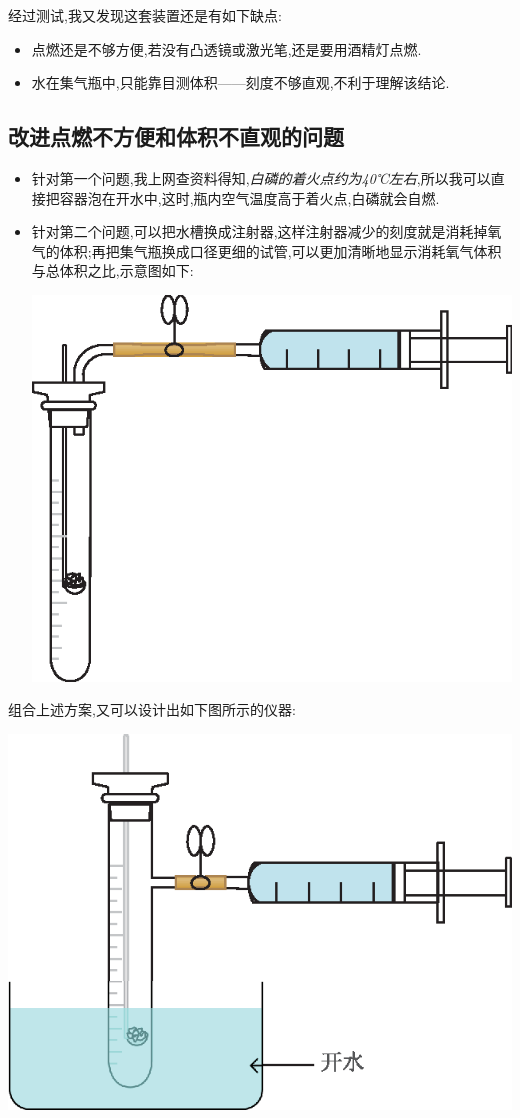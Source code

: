 \documentclass[11pt,a4paper,titlepage,twocolumn]{ctexart}
\begin{document}
	经过测试,我又发现这套装置还是有如下缺点:
	
	\begin{itemize}
		\item 点燃还是不够方便,若没有凸透镜或激光笔,还是要用酒精灯点燃.
		\item 水在集气瓶中,只能靠目测体积——刻度不够直观,不利于理解该结论.
	\end{itemize}
	
	\subsection{改进点燃不方便和体积不直观的问题}
	
	\begin{itemize}
		\item 针对第一个问题,我上网查资料得知,\textit{白磷的着火点约为40℃左右},所以我可以直接把容器泡在开水中,这时,瓶内空气温度高于着火点,白磷就会自燃.
		\item 针对第二个问题,可以把水槽换成注射器,这样注射器减少的刻度就是消耗掉氧气的体积;再把集气瓶换成口径更细的试管,可以更加清晰地显示消耗氧气体积与总体积之比,示意图如下:\\
		\begin{center}
			\includegraphics[width=0.8\linewidth]{fig/4}
		\end{center}
	\end{itemize}
		
	组合上述方案,又可以设计出如下图所示的仪器:
		
	\begin{center}
		\includegraphics[width=0.8\linewidth]{fig/5}
	\end{center}
		
\end{document}
